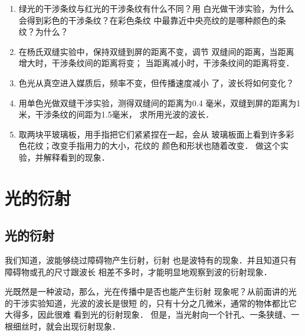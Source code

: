 \begin{enumerate}
\item 绿光的干涉条纹与红光的干涉条纹有什么不同？用
白光做干涉实验，为什么会得到彩色的干涉条纹？在彩色条纹
中最靠近中央亮纹的是哪种颜色的条纹？为什么？
\item 在杨氏双缝实验中，保持双缝到屏的距离不变，调节
双缝间的距离，当距离增大时，干涉条纹间的距离将变\underline{\qquad}；
当距离减小时，干涉条纹间的距离将变\underline{\qquad}．
\item 色光从真空进入媒质后，频率不变，但传播速度减小
了，波长将如何变化？
\item 用单色光做双缝干涉实验，测得双缝间的距离为0.4
毫米，双缝到屏的距离为1米，干涉条纹的间距为1.5毫米，
求所用光波的波长．
\item 取两块平玻璃板，用手指把它们紧紧捏在一起，会从
玻璃板面上看到许多彩色花纹；改变手指用力的大小，花纹的
颜色和形状也随着改变．
做这个实验，并解释看到的现象．
\end{enumerate}

\section{光的衍射}
\subsection{光的衍射}

我们知道，波能够绕过障碍物产生衍射，衍射
也是波特有的现象．并且知道只有障碍物或孔的尺寸跟波长
相差不多时，才能明显地观察到波的衍射现象．

光既然是一种波动，那么，光在传播中是否也能产生衍射
现象呢？从前面讲的光的干涉实验知道，光波的波长是很短
的，只有十分之几微米，通常的物体都比它大得多，因此很难
看到光的衍射现象．
但是，当光射向一个针孔、一条狭缝、一
根细丝时，就会出现衍射现象．

